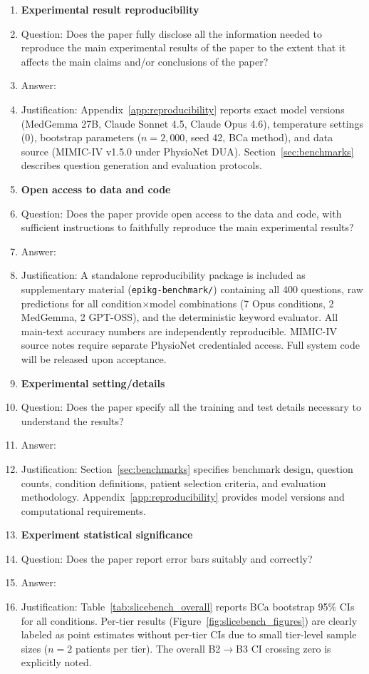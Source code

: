 \begin{enumerate}
\item {\bf Experimental result reproducibility}
    \item[] Question: Does the paper fully disclose all the information needed to reproduce the main experimental results of the paper to the extent that it affects the main claims and/or conclusions of the paper?
    \item[] Answer: \answerYes{}
    \item[] Justification: Appendix~\ref{app:reproducibility} reports exact model versions (MedGemma 27B, Claude Sonnet 4.5, Claude Opus 4.6), temperature settings (0), bootstrap parameters ($n=2{,}000$, seed 42, BCa method), and data source (MIMIC-IV v1.5.0 under PhysioNet DUA). Section~\ref{sec:benchmarks} describes question generation and evaluation protocols.

\item {\bf Open access to data and code}
    \item[] Question: Does the paper provide open access to the data and code, with sufficient instructions to faithfully reproduce the main experimental results?
    \item[] Answer: \answerYes{}
    \item[] Justification: A standalone reproducibility package is included as supplementary material (\texttt{epikg-benchmark/}) containing all 400 questions, raw predictions for all condition$\times$model combinations (7 Opus conditions, 2 MedGemma, 2 GPT-OSS), and the deterministic keyword evaluator. All main-text accuracy numbers are independently reproducible. MIMIC-IV source notes require separate PhysioNet credentialed access. Full system code will be released upon acceptance.

\item {\bf Experimental setting/details}
    \item[] Question: Does the paper specify all the training and test details necessary to understand the results?
    \item[] Answer: \answerYes{}
    \item[] Justification: Section~\ref{sec:benchmarks} specifies benchmark design, question counts, condition definitions, patient selection criteria, and evaluation methodology. Appendix~\ref{app:reproducibility} provides model versions and computational requirements.

\item {\bf Experiment statistical significance}
    \item[] Question: Does the paper report error bars suitably and correctly?
    \item[] Answer: \answerYes{}
    \item[] Justification: Table~\ref{tab:slicebench_overall} reports BCa bootstrap 95\% CIs for all conditions. Per-tier results (Figure~\ref{fig:slicebench_figures}) are clearly labeled as point estimates without per-tier CIs due to small tier-level sample sizes ($n=2$ patients per tier). The overall B2$\rightarrow$B3 CI crossing zero is explicitly noted.


\end{enumerate}
